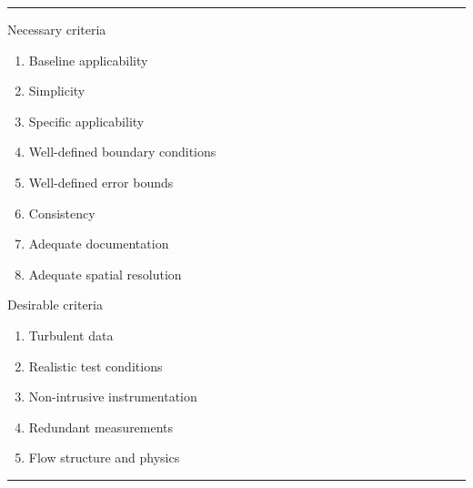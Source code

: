 \begin{table}
\centering
\caption[Data assessment criteria due to \citeauthor{Settles1991Hypersonic}]{%
  While ``\dots{}looking for those few experimental studies of unimpeachable
  quality\dots'' in the super- and hypersonics literature,
  \citet{Settles1994Hypersonic, Settles1991Hypersonic, Settles1993Hypersonic,
  Settles1994Supersonic} set forth these criteria for assessing the utility of
  data sets to the testing and validation of turbulence
  models.\label{tbl:datacriteria}
}
\begin{minipage}[t]{0.97\textwidth}
\hrule
\vspace{0.5\baselineskip}
\begin{minipage}[t]{0.495\textwidth}
  \begin{center}
    Necessary criteria
  \end{center}
  \begin{enumerate}
    \item Baseline  applicability
    \item Simplicity \label{itm:criterion_simplicity}
    \item Specific applicability
    \item Well-defined {boundary conditions} \label{itm:criterion_bcs}
    \item Well-defined error bounds \label{itm:criterion_bounds}
    \item Consistency
    \item Adequate documentation
    \item Adequate spatial resolution
  \end{enumerate}
\end{minipage}
\hfill
\begin{minipage}[t]{0.495\textwidth}
  \begin{center}
    Desirable criteria
  \end{center}
  \begin{enumerate}
    \item Turbulent data \label{itm:criterion_turbulentdata}
    \item Realistic test conditions \label{itm:criterion_realistic}
    \item Non-intrusive instrumentation
    \item Redundant measurements
    \item Flow structure and physics
  \end{enumerate}
\end{minipage}
\vspace{0.5\baselineskip}
\hrule
\end{minipage}
\end{table}
